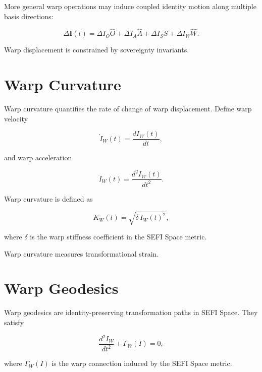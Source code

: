 \documentclass[12pt,twoside]{article}
\begin{document}
More general warp operations may induce coupled identity motion along multiple basis
directions:



\[
\Delta \mathbf{I}(t) = \Delta I_{O}\hat{O} + \Delta I_{A}\hat{A} + \Delta I_{S}\hat{S} + \Delta I_{W}\hat{W}.
\]



Warp displacement is constrained by sovereignty invariants.

\section{Warp Curvature}

Warp curvature quantifies the rate of change of warp displacement. Define warp velocity



\[
\dot{I}_{W}(t) = \frac{d I_{W}(t)}{dt},
\]



and warp acceleration



\[
\ddot{I}_{W}(t) = \frac{d^{2} I_{W}(t)}{dt^{2}}.
\]



Warp curvature is defined as



\[
K_{W}(t) = \sqrt{\delta \, \dot{I}_{W}(t)^{2}},
\]



where $\delta$ is the warp stiffness coefficient in the SEFI Space metric.

Warp curvature measures transformational strain.

\section{Warp Geodesics}

Warp geodesics are identity-preserving transformation paths in SEFI Space. They satisfy



\[
\frac{d^{2} I_{W}}{dt^{2}} + \Gamma_{W}(I) = 0,
\]



where $\Gamma_{W}(I)$ is the warp connection induced by the SEFI Space metric.
\end{document}
